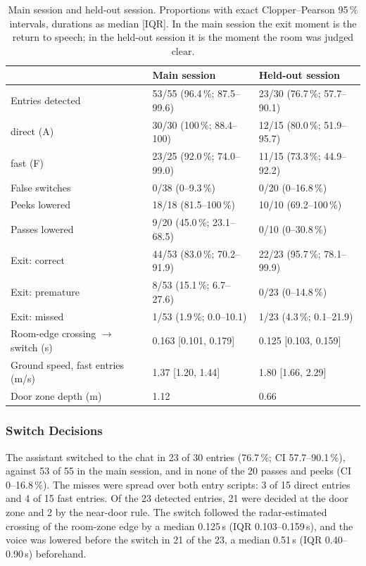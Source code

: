 \begin{table}[htb]
  \centering
  \small
  \caption{Main session and held-out session. Proportions with exact
  Clopper--Pearson 95\,\% intervals, durations as median [IQR]. In the main
  session the exit moment is the return to speech; in the held-out session it
  is the moment the room was judged clear.}
  \label{tab:ps-holdout-compare}
  \begin{tabular}{lll}
    \toprule
    & Main session & Held-out session \\
    \midrule
    Entries detected      & 53/55 (96.4\,\%; 87.5--99.6) & 23/30 (76.7\,\%; 57.7--90.1) \\
    \quad direct (A)      & 30/30 (100\,\%; 88.4--100)   & 12/15 (80.0\,\%; 51.9--95.7) \\
    \quad fast (F)        & 23/25 (92.0\,\%; 74.0--99.0) & 11/15 (73.3\,\%; 44.9--92.2) \\
    False switches        & 0/38 (0--9.3\,\%)            & 0/20 (0--16.8\,\%) \\
    \addlinespace
    Peeks lowered         & 18/18 (81.5--100\,\%)        & 10/10 (69.2--100\,\%) \\
    Passes lowered        & 9/20 (45.0\,\%; 23.1--68.5)  & 0/10 (0--30.8\,\%) \\
    \addlinespace
    Exit: correct         & 44/53 (83.0\,\%; 70.2--91.9) & 22/23 (95.7\,\%; 78.1--99.9) \\
    Exit: premature       & 8/53 (15.1\,\%; 6.7--27.6)   & 0/23 (0--14.8\,\%) \\
    Exit: missed          & 1/53 (1.9\,\%; 0.0--10.1)    & 1/23 (4.3\,\%; 0.1--21.9) \\
    \addlinespace
    Room-edge crossing $\to$ switch (s) & 0.163 [0.101, 0.179] & 0.125 [0.103, 0.159] \\
    Ground speed, fast entries (m/s)    & 1.37 [1.20, 1.44]    & 1.80 [1.66, 2.29] \\
    Door zone depth (m)                 & 1.12                 & 0.66 \\
    \bottomrule
  \end{tabular}
\end{table}

\subsubsection{Switch Decisions}

The assistant switched to the chat in 23 of 30 entries (76.7\,\%; CI
57.7--90.1\,\%), against 53 of 55 in the main session, and in none of the
20 passes and peeks (CI 0--16.8\,\%). The misses were spread over both entry
scripts: 3 of 15 direct entries and 4 of 15 fast entries. Of the 23 detected
entries, 21 were decided at the door zone and 2 by the near-door rule. The
switch followed the radar-estimated crossing of the room-zone edge by a median
0.125\,s (IQR 0.103--0.159\,s), and the voice was lowered before the switch in
21 of the 23, a median 0.51\,s (IQR 0.40--0.90\,s) beforehand.

